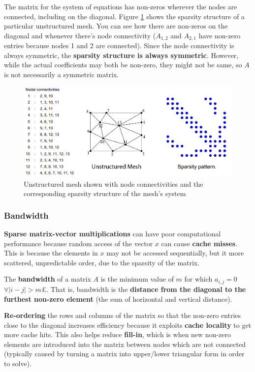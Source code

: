\documentclass{article}
\begin{document}
The matrix for the system of equations has non-zeros wherever the nodes are connected, including on the diagonal. Figure \ref{fig:unstructured-mesh-sparsity} shows the sparsity structure of a particular unstructured mesh. You can see how there are non-zeros on the diagonal and whenever there's node connectivity ($A_{1,2}$ and $A_{2,1}$ have non-zero entries because nodes 1 and 2 are connected). Since the node connectivity is always symmetric, the \textbf{sparsity structure is always symmetric}. However, while the actual coefficients may both be non-zero, they might not be same, so $A$ is not necessarily a symmetric matrix.
\begin{figure}
	\centering
	\includegraphics[scale=0.4]{figures/unstructurered-sparsity-structure.png}
	\caption{Unstructured mesh shown with node connectivities and the corresponding sparsity structure of the mesh's system}
	\label{fig:unstructured-mesh-sparsity}
\end{figure}

\subsubsection{Bandwidth}

\textbf{Sparse matrix-vector multiplications} can have poor computational performance because random access of the vector $x$ can cause \textbf{cache misses}. This is because the elements in $x$ may not be accessed sequentially, but it more scattered, unpredictable order, due to the sparsity of the matrix.

The \textbf{bandwidth} of a matrix $A$ is the minimum value of $m$ for which $a_{i,j} = 0$ $\forall |i - j| > m$£. That is, bandwidth is the \textbf{distance from the diagonal to the furthest non-zero element} (the sum of horizontal and vertical distance).

\textbf{Re-ordering} the rows and columns of the matrix so that the non-zero entries close to the diagonal increases efficiency because it exploits \textbf{cache locality} to get more cache hits. This also helps reduce \textbf{fill-in}, which is when new non-zero elements are introduced into the matrix between nodes which are not connected (typically caused by turning a matrix into upper/lower triangular form in order to solve).
\end{document}
